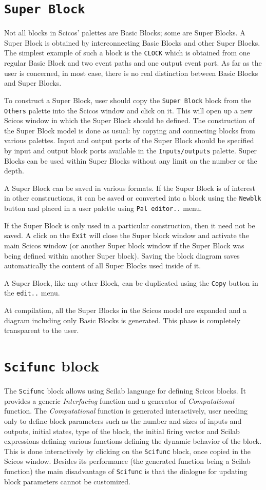 \documentclass{book}
\newcommand{\computational}{{\em Computational }}
\newcommand{\interfacing}{{\em Interfacing }}
\begin{document}
\section{{\tt Super Block}}
Not all blocks in Scicos' palettes are Basic Blocks; some are
Super Blocks. A Super Block is obtained by interconnecting Basic Blocks
and other Super Blocks. The simplest example of such a block is the
{\tt CLOCK} which is obtained from one regular Basic Block and two event
paths and one output event port. As far as the user is concerned, in
most case, there is no real distinction between Basic Blocks and Super Blocks. 


 
To construct a Super Block, user should copy the {\tt Super Block}
block from the {\tt Others} palette into the Scicos   window and click
on it. This will open up a new Scicos   window in which the Super Block
should be defined. 
The construction of the Super Block model is done as usual: by copying and
connecting blocks from various palettes. Input and output ports of the
Super Block should be specified by input and output block ports available 
in the {\tt Inputs/outputs} palette. Super Blocks can be used within
Super Blocks without any limit on the number or the depth.
 

A Super Block can be saved in various formats. If the Super Block is
of interest in other constructions, it can be saved or converted into a
block using the {\tt Newblk} button and placed in a user palette using
{\tt Pal editor..} menu. 

If the Super Block is only used in a particular construction, then
it need not be saved. A click on the {\tt Exit} will close the Super
block window and activate the main Scicos   window (or another Super
block window if the Super Block was being defined within another Super
block). Saving the block diagram saves automatically the content of
all Super Blocks used inside of it.

A Super Block, like any other Block, can be duplicated using
the {\tt Copy} button in the {\tt edit..} menu.


At compilation, all the Super Blocks in the Scicos  model are expanded
and a diagram including only Basic Blocks is generated. This phase is
completely transparent to the user.


\section{{\tt Scifunc} block}
The {\tt Scifunc} block allows using Scilab language for defining
Scicos blocks. It provides a generic \interfacing function
and a generator of \computational function. The \computational
function is generated interactively, user needing only to define
block parameters such as the number and sizes of inputs and outputs, initial
states, type of the block, the initial firing vector and Scilab
expressions defining various functions defining the dynamic behavior
of the block. This is done interactively by clicking on the
{\tt Scifunc} block, once copied in the Scicos window. Besides
its performance (the generated function being a Scilab function)
the main
disadvantage of {\tt Scifunc} is that the dialogue for updating block
parameters cannot be customized. 
\end{document}
